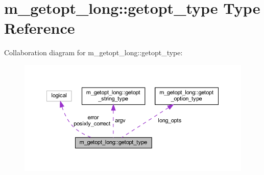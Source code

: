 \hypertarget{structm__getopt__long_1_1getopt__type}{}\section{m\+\_\+getopt\+\_\+long\+:\+:getopt\+\_\+type Type Reference}
\label{structm__getopt__long_1_1getopt__type}


Collaboration diagram for m\+\_\+getopt\+\_\+long\+:\+:getopt\+\_\+type\+:
\nopagebreak
\begin{figure}[H]
\begin{center}
\leavevmode
\includegraphics[width=350pt]{structm__getopt__long_1_1getopt__type__coll__graph}
\end{center}
\end{figure}
